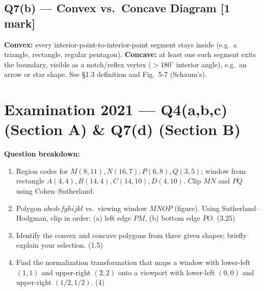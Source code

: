 \documentclass[12pt, a4paper]{article}
\newenvironment{solutionbox}{\begin{mdframed}[style=solutionframe]}{\end{mdframed}}
\newenvironment{answerbox}{\begin{mdframed}[style=answerframe]}{\end{mdframed}}
\begin{document}
\subsection*{Q7(b) --- Convex vs.\ Concave Diagram [1 mark]}
\begin{answerbox}
\textbf{Convex:} every interior-point-to-interior-point segment stays inside (e.g.\ a triangle, rectangle, regular pentagon). \textbf{Concave:} at least one such segment exits the boundary, visible as a notch/reflex vertex ($>180^\circ$ interior angle), e.g.\ an arrow or star shape. See \S1.3 definition and Fig.\ 5-7 (Schaum's).
\end{answerbox}

\section{Examination 2021 --- Q4(a,b,c) (Section A) \& Q7(d) (Section B)}
\begin{solutionbox}
\textbf{Question breakdown:}
\begin{enumerate}[noitemsep]
  \item[Q4(a)] Region codes for $M(8,11),N(16,7),P(6,8),Q(3,5)$; window from rectangle $A(4,4),B(14,4),C(14,10),D(4,10)$. Clip $MN$ and $PQ$ using Cohen--Sutherland.
  \item[Q4(b)] Polygon $abcdefghijkl$ vs.\ viewing window $MNOP$ (figure). Using Sutherland--Hodgman, clip in order: (a) left edge $PM$, (b) bottom edge $PO$. (3.25)
  \item[Q4(c)] Identify the convex and concave polygons from three given shapes; briefly explain your selection. (1.5)
  \item[Q7(d)] Find the normalization transformation that maps a window with lower-left $(1,1)$ and upper-right $(2,2)$ onto a viewport with lower-left $(0,0)$ and upper-right $(1/2,1/2)$. (4)
\end{enumerate}
\end{solutionbox}
\end{document}
